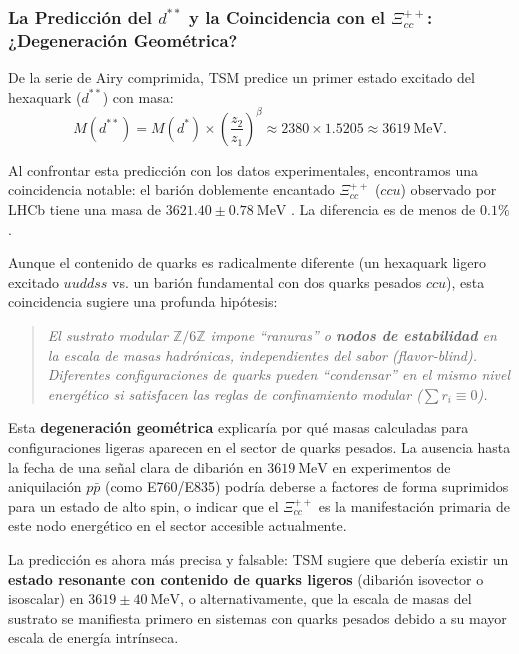 \documentclass[11pt, a4paper]{article}
\theoremstyle{plain}
\theoremstyle{definition}
\begin{document}
\subsubsection{\texorpdfstring{La Predicción del $d^{**}$ y la Coincidencia con el $\Xi_{cc}^{++}$: ¿Degeneración Geométrica?}{La Predicción del d** y la Coincidencia con el Xi-cc++: ¿Degeneración Geométrica?}}
\label{subsec:dstarstar_Coincidencia}

De la serie de Airy comprimida, TSM predice un primer estado excitado del hexaquark ($d^{**}$) con masa:
\begin{equation}
M(d^{**}) = M(d^*) \times \left(\frac{z_2}{z_1}\right)^\beta \approx 2380 \times 1.5205 \approx 3619\ \si{\mega\electronvolt}.
\end{equation}

Al confrontar esta predicción con los datos experimentales, encontramos una coincidencia notable: el barión doblemente encantado $\Xi_{cc}^{++}$ ($ccu$) observado por LHCb tiene una masa de $3621.40 \pm 0.78\ \si{\mega\electronvolt}$ \cite{LHCb2017_Xicc}. La diferencia es de menos de $0.1\%$.

Aunque el contenido de quarks es radicalmente diferente (un hexaquark ligero excitado $uuddss$ vs. un barión fundamental con dos quarks pesados $ccu$), esta coincidencia sugiere una profunda hipótesis:

\begin{quote}
\emph{El sustrato modular $\mathbb{Z}/6\mathbb{Z}$ impone ``ranuras'' o \textbf{nodos de estabilidad} en la escala de masas hadrónicas, independientes del sabor (\textit{flavor-blind}). Diferentes configuraciones de quarks pueden ``condensar'' en el mismo nivel energético si satisfacen las reglas de confinamiento modular ($\sum r_i \equiv 0$).}
\end{quote}

Esta \textbf{degeneración geométrica} explicaría por qué masas calculadas para configuraciones ligeras aparecen en el sector de quarks pesados. La ausencia hasta la fecha de una señal clara de dibarión en $3619\ \si{\mega\electronvolt}$ en experimentos de aniquilación $p\bar{p}$ (como E760/E835) podría deberse a factores de forma suprimidos para un estado de alto spin, o indicar que el $\Xi_{cc}^{++}$ es la manifestación primaria de este nodo energético en el sector accesible actualmente.

La predicción es ahora más precisa y falsable: TSM sugiere que debería existir un \textbf{estado resonante con contenido de quarks ligeros} (dibarión isovector o isoscalar) en $3619 \pm 40\ \si{\mega\electronvolt}$, o alternativamente, que la escala de masas del sustrato se manifiesta primero en sistemas con quarks pesados debido a su mayor escala de energía intrínseca.
\end{document}
